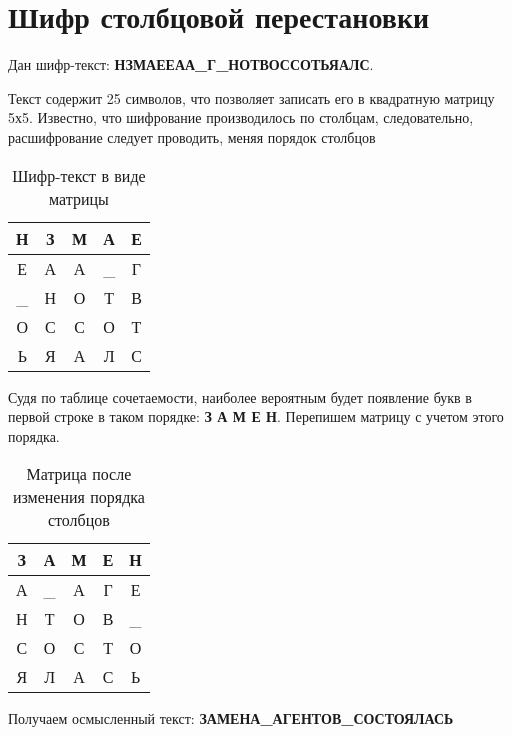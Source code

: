 \section{Шифр столбцовой перестановки}

Дан шифр-текст: \textbf{НЗМАЕЕАА\_Г\_НОТВОССОТЬЯАЛС}.

Текст содержит 25 символов, что позволяет записать его в квадратную матрицу 5х5. Известно, что шифрование производилось по столбцам, следовательно, расшифрование следует проводить, меняя порядок столбцов

\begin{table}[H]
	\centering
	\begin{tabular}{|c|c|c|c|c|}
		\hline
		Н & З & М & А & Е \\ \hline
		Е & А & А & \_  & Г \\ \hline
		\_ & Н & О & Т & В \\ \hline
		О & С & С & О & Т \\ \hline
		Ь & Я & А & Л & С \\ \hline
	\end{tabular}
	\caption{Шифр-текст в виде матрицы}
\end{table}

Судя по таблице сочетаемости, наиболее вероятным будет появление букв в первой строке в таком порядке: \textbf{З А М Е Н}. Перепишем матрицу с учетом этого порядка.

\begin{table}[H]
	\centering
\begin{tabular}{|c|c|c|c|c|}
	\hline
	З & А  & М & Е & Н  \\ \hline
	А & \_ & А & Г & Е  \\ \hline
	Н & Т  & О & В & \_ \\ \hline
	С & О  & С & Т & О  \\ \hline
	Я & Л  & А & С & Ь  \\ \hline
\end{tabular}
	\caption{Матрица после изменения порядка столбцов}
\end{table}

Получаем осмысленный текст: \textbf{ЗАМЕНА\_АГЕНТОВ\_СОСТОЯЛАСЬ}